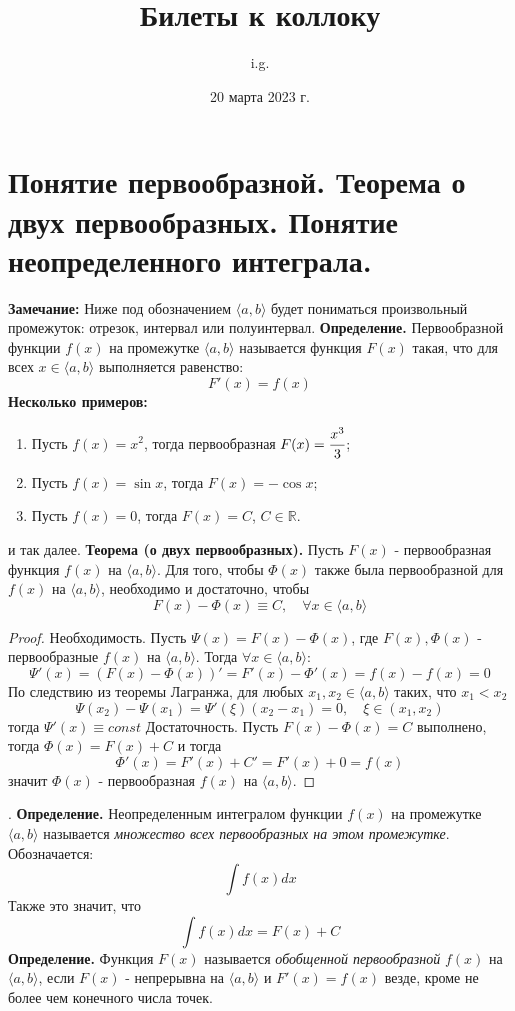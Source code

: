 \documentclass{article}
\title{\textbf{Билеты к коллоку}}
\author{i.g.}
\date{20 марта 2023 г.}
\newcommand*{\theorem}[2]{\textbf{Теорема #1. } #2 \newline}
\newcommand*{\definition}[1]{\textbf{Определение.} #1 \newline}
\newcommand*{\R}{\mathbb{R}}
\begin{document}
\tableofcontents
\maketitle

\section{Понятие первообразной. Теорема о двух первообразных. Понятие неопределенного интеграла.}

\textbf{Замечание: } Ниже под обозначением $\langle a, b \rangle$ будет пониматься произвольный промежуток: отрезок, интервал или полуинтервал.
\newline
\newline
\definition{Первообразной функции $f(x)$ на промежутке $\langle a, b \rangle$ называется функция $F(x)$ такая, что для всех $x \in \langle a, b \rangle$ выполняется равенство: }
$$
    F'(x) = f(x)
$$
\textbf{Несколько примеров: } 
\begin{enumerate}
    \item Пусть $f(x) = x^2$, тогда первообразная $F(x) = \cfrac{x^3}{3}$;
    \item Пусть $f(x) = \sin x$, тогда $F(x) = -\cos x$;
    \item Пусть $f(x) = 0$, тогда $F(x) = C$, $C \in \R$. 
\end{enumerate}
и так далее.
\newline 
\newline 
\theorem{(о двух первообразных)}{Пусть $F(x)$ - первообразная функция $f(x)$ на $\langle a, b \rangle$. Для того, чтобы $\Phi(x)$ также была первообразной для $f(x)$ на $\langle a, b \rangle$, необходимо и достаточно, чтобы}
$$
    F(x) - \Phi(x) \equiv C, \quad \forall x \in \langle a, b \rangle
$$
\begin{proof}
    Необходимость. Пусть $\Psi(x) = F(x) - \Phi(x)$, где $F(x), \Phi(x)$ - первообразные $f(x)$ на $\langle a, b \rangle$. Тогда $\forall x \in \langle a, b \rangle$:
    $$
        \Psi'(x) = (F(x) - \Phi(x))' = F'(x) - \Phi'(x) = f(x) - f(x) = 0
    $$
    По следствию из теоремы Лагранжа, для любых $x_1, x_2 \in \langle a,b \rangle$ таких, что $x_1 < x_2$
    $$
        \Psi(x_2) - \Psi(x_1) = \Psi'(\xi)(x_2 - x_1) = 0, \quad \xi \in (x_1, x_2) 
    $$
    тогда $\Psi'(x) \equiv const$
    \newline
    \newline 
    Достаточность. Пусть $F(x) - \Phi(x) = C$ выполнено, тогда $\Phi(x) = F(x) + C$ и тогда
    $$
        \Phi'(x) = F'(x) + C' = F'(x) + 0 = f(x)
    $$
    значит $\Phi(x)$ - первообразная $f(x)$ на $\langle a, b \rangle$.
\end{proof}
.
\newline
\definition{Неопределенным интегралом функции $f(x)$ на промежутке $\langle a, b \rangle$ называется \textit{множество всех первообразных на этом промежутке}. Обозначается:}
$$
    \int f(x)dx
$$
Также это значит, что 
$$
\int f(x)dx = F(x) + C
$$
\definition{Функция $F(x)$ называется \textit{обобщенной первообразной} $f(x)$ на $\langle a, b \rangle$, если $F(x)$ - непрерывна на $\langle a, b \rangle$ и $F'(x) = f(x)$ везде, кроме не более чем конечного числа точек.}
\end{document}
